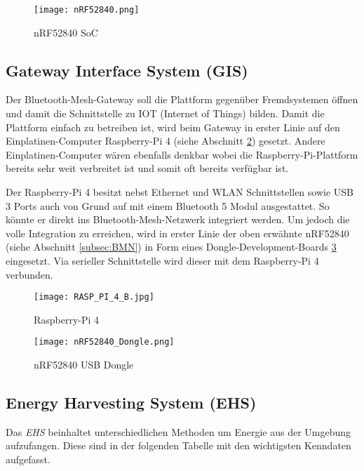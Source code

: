 \begin{figure}[h]
	\centering
	\texttt{[image: nRF52840.png]}
	\caption{nRF52840 SoC \cite{nordic_semiconductor_nrf52840-qiaa.png_2019}}
	\label{img:nRF52840}
\end{figure} 

\subsection{Gateway Interface System (GIS)}\label{subsec:Gateway}
Der Bluetooth-Mesh-Gateway soll die Plattform gegenüber Fremdsystemen öffnen und damit die Schnittstelle zu IOT (Internet of Things) bilden. Damit die Plattform einfach zu betreiben ist, wird beim Gateway in erster Linie auf den Einplatinen-Computer Raspberry-Pi 4 (siehe Abschnitt \ref{img:raspberryPi4}) gesetzt. Andere Einplatinen-Computer wären ebenfalls denkbar wobei die Raspberry-Pi-Plattform bereits sehr weit verbreitet ist und somit oft bereits verfügbar ist.

Der Raspberry-Pi 4 besitzt nebst Ethernet und WLAN Schnittstellen sowie USB 3 Ports auch von Grund auf mit einem Bluetooth 5 Modul ausgestattet. So könnte er direkt ins Bluetooth-Mesh-Netzwerk integriert werden. Um jedoch die volle Integration zu erreichen, wird in erster Linie der oben erwähnte nRF52840 (siehe Abschnitt \ref{subsec:BMN}) in Form eines Dongle-Development-Boards \ref{img:nRF52840USBDongle} eingesetzt. Via serieller Schnittstelle wird dieser mit dem Raspberry-Pi 4 verbunden.


\begin{figure}[h]
	\centering
	\texttt{[image: RASP\_PI\_4\_B.jpg]}
	\caption{Raspberry-Pi 4 \cite{reichelt_elektronik_gmbh_&_co_kg_rasp_nodate}}
	\label{img:raspberryPi4}
\end{figure} 

\begin{figure}[h]
	\centering
	\texttt{[image: nRF52840\_Dongle.png]}
	\caption{nRF52840 USB Dongle \cite{nordic_semiconductor_nrf52840-dongle-promo.png_2019}}
	\label{img:nRF52840USBDongle}
\end{figure} 


\subsection{Energy Harvesting System (EHS)}\label{subsec:EHS}

Das \textit{EHS} beinhaltet unterschiedlichen Methoden um Energie aus der Umgebung aufzufangen. Diese sind in der folgenden Tabelle mit den wichtigsten Kenndaten aufgefasst. 

